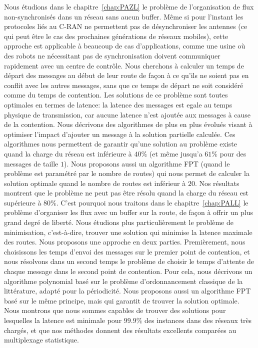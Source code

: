 Nous étudions dans le chapitre~\ref{chap:PAZL} le problème de l'organisation de flux non-synchronisés dans un réseau sans aucun buffer.
Même si pour l'instant les protocoles liés au C-RAN ne permettent pas de désynchroniser les antennes (ce qui peut être le cas des prochaines générations de réseaux mobiles), cette approche est applicable à beaucoup de cas d'applications, comme une usine où des robots ne nécessitant pas de synchronisation doivent communiquer rapidement avec un centre de contrôle.
Nous cherchons à calculer un temps de départ des messages au début de leur route de façon à ce qu'ils ne soient pas en conflit avec les autres messages, sans que ce temps de départ ne soit considéré comme du temps de contention.
Les solutions de ce problème sont toutes optimales en termes de latence: la latence des messages est egale au temps physique de transmission, car aucune latence n'est ajoutée aux messages à cause de la contention. Nous décrivons des algorithmes de plus en plus évolués visant à optimiser l'impact d'ajouter un message à la solution partielle calculée. Ces algorithmes nous permettent de garantir qu'une solution au problème existe quand la charge du réseau est inférieure à $40\%$ (et même jusqu'a $61\%$ pour des messages de taille $1$). Nous proposons aussi un algorithme FPT (quand le problème est paramétré par le nombre de routes) qui nous permet de calculer la solution optimale quand le nombre de routes est inférieur à $20$. Nos résultats montrent que le problème ne peut pas être résolu quand la charge du réseau est supérieure à $80\%$.
C'est pourquoi nous traitons dans le chapitre~\ref{chap:PALL} le problème d'organiser les flux avec un buffer sur la route, de façon à offrir un plus grand degré de liberté. Nous étudions plus particulièrement le problème de minimisation, c'est-à-dire, trouver une solution qui minimise la latence maximale des routes. Nous proposons une approche en deux parties. Premièrement, nous choisissons les temps d'envoi des messages sur le premier point de contention, et nous résolvons dans un second temps le problème de choisir le temps d'attente de chaque message dans le second point de contention. Pour cela, nous décrivons un algorithme polynomial basé sur le problème d'ordonnancement classique de la littérature, adapté pour la périodicité. Nous proposons aussi un algorithme FPT basé sur le même principe, mais qui garantit de trouver la solution optimale. Nous montrons que nous sommes capables de trouver des solutions pour lesquelles la latence est minimale pour $99.9\%$ des instances dans des réseaux très chargés, et que nos méthodes donnent des résultats excellents comparées au multiplexage statistique.

